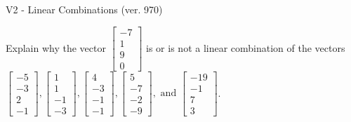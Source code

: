 \begin{exercise}
  \begin{exerciseTitle}V2 - Linear Combinations (ver. 970)\end{exerciseTitle}
  \begin{exerciseStatement}
    Explain why the vector \(\left[\begin{array}{c}
-7 \\
1 \\
9 \\
0
\end{array}\right]\)  is or is not a linear 
	combination of the vectors \(\left[\begin{array}{c}
-5 \\
-3 \\
2 \\
-1
\end{array}\right] , \left[\begin{array}{c}
1 \\
1 \\
-1 \\
-3
\end{array}\right] , \left[\begin{array}{c}
4 \\
-3 \\
-1 \\
-1
\end{array}\right] , \left[\begin{array}{c}
5 \\
-7 \\
-2 \\
-9
\end{array}\right] , \text{ and } \left[\begin{array}{c}
-19 \\
-1 \\
7 \\
3
\end{array}\right]\).
	



\end{exerciseStatement}
\end{exercise}
